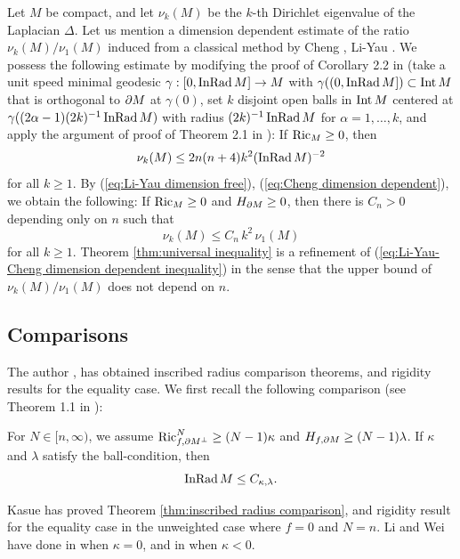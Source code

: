 \begin{rem}\label{rem:dimension dependent inequality}
Let $M$ be compact,
and let $\nu_{k}(M)$ be the $k$-th Dirichlet eigenvalue of the Laplacian $\Delta$.
Let us mention a dimension dependent estimate of the ratio $\nu_{k}(M)/\nu_{1}(M)$ induced from a classical method by Cheng \cite{Ch}, Li-Yau \cite{LY}.
We possess the following estimate by modifying the proof of Corollary 2.2 in \cite{Ch} (take a unit speed minimal geodesic $\gamma:[0,\operatorname{InRad} M]\to M$ with $\gamma((0,\operatorname{InRad} M])\subset \mathrm{Int}\, M$ that is orthogonal to $\partial M$ at $\gamma(0)$,
set $k$ disjoint open balls in $\mathrm{Int}\, M$ centered at $\gamma((2\alpha-1)(2k)^{-1} \operatorname{InRad} M)$ with radius $(2k)^{-1} \operatorname{InRad} M$ for $\alpha=1,\dots,k$,
and apply the argument of proof of Theorem 2.1 in \cite{Ch}):
If $\operatorname{Ric}_{M}\geq 0$,
then
\begin{equation}\label{eq:Cheng dimension dependent}
\nu_{k}(M)\leq 2n(n+4)k^{2} (\operatorname{InRad} M)^{-2}
\end{equation}
for all $k\geq 1$.
By (\ref{eq:Li-Yau dimension free}), (\ref{eq:Cheng dimension dependent}),
we obtain the following:
If $\operatorname{Ric}_{M}\geq 0$ and $H_{\partial M}\geq 0$,
then there is $C_{n}>0$ depending only on $n$ such that
\begin{equation}\label{eq:Li-Yau-Cheng dimension dependent inequality}
\nu_{k}(M)\leq C_{n}\,k^{2}\,\nu_{1}(M)
\end{equation}
for all $k\geq 1$.
Theorem \ref{thm:universal inequality} is a refinement of (\ref{eq:Li-Yau-Cheng dimension dependent inequality}) in the sense that
the upper bound of $\nu_{k}(M)/\nu_{1}(M)$ does not depend on $n$.
\end{rem}

\subsection{Comparisons}\label{sec:Comparison theorems}
The author \cite{S1}, \cite{S2} has obtained inscribed radius comparison theorems,
and rigidity results for the equality case.
We first recall the following comparison (see Theorem 1.1 in \cite{S1}):
\begin{thm}[\cite{S1}]\label{thm:inscribed radius comparison}
For $N\in [n,\infty)$,
we assume $\operatorname{Ric}^{N}_{f,\partial M^{\perp}}\geq (N-1)\kappa$ and $H_{f,\partial M}\geq (N-1)\lambda$.
If $\kappa$ and $\lambda$ satisfy the ball-condition,
then
\begin{equation*}
\operatorname{InRad} M \leq C_{\kappa,\lambda}.
\end{equation*}
\end{thm}
\begin{rem}
Kasue \cite{K1} has proved Theorem \ref{thm:inscribed radius comparison},
and rigidity result for the equality case in the unweighted case where $f=0$ and $N=n$.
Li and Wei have done in \cite{LW2} when $\kappa=0$,
and in \cite{LW1} when $\kappa<0$.
\end{rem}

